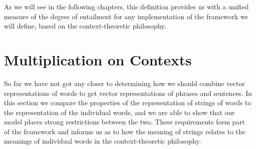 As we will see in the following chapters, this definition provides us with a unified measure of the degree of entailment for any implementation of the framework we will define, based on the context-theoretic philosophy.


%



\section{Multiplication on Contexts}

So far we have not got any closer to determining how we should combine vector representations of words to get vector representations of phrases and sentences. In this section we compare the properties of the representation of strings of words to the representation of the individual words, and we are able to show that our model places strong restrictions between the two. These requirements form part of the  framework and informs us as to how the meaning of strings relates to the meanings of individual words in the context-theoretic philosophy.


